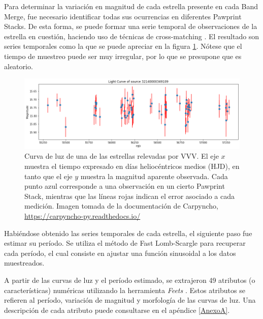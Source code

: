 \par Para determinar la variación en magnitud de cada estrella presente en cada Band Merge, fue necesario identificar todas sus ocurrencias en diferentes Pawprint Stacks. De esta forma, se puede formar una serie temporal de observaciones de la estrella en cuestión, haciendo uso de técnicas de cross-matching \cite{cross}. El resultado son series temporales como la que se puede apreciar en la figura \ref{fig:curva_de_luz}. Nótese que el tiempo de muestreo puede ser muy irregular, por lo que se presupone que es aleatorio. \\


\begin{figure}[h]
\begin{center}
\includegraphics[width=\textwidth]{Kap1/light_curve.png}
\end{center}
\caption[short]{Curva de luz de una de las estrellas relevadas por VVV. El eje $x$ muestra el tiempo expresado en días heliocéntricos medios (HJD), en tanto que el eje $y$ muestra la magnitud aparente observada. Cada punto azul corresponde a una observación en un cierto Pawprint Stack, mientras que las líneas rojas indican el error asociado a cada medición. Imagen tomada de la documentación de Carpyncho, \url{https://carpyncho-py.readthedocs.io/} }
\label{fig:curva_de_luz}
\end{figure}

\par Habiéndose obtenido las series temporales de cada estrella, el siguiente paso fue estimar su período. Se utiliza el método de Fast Lomb-Scargle \cite{Lomb:1976wy} \cite{scargle} \cite{VanderPlas_2018} para recuperar cada período, el cual consiste en ajustar una función sinusoidal a los datos muestreados. \\

\par A partir de las curvas de luz y el período estimado, se extrajeron 49 atributos (o características) numéricas utilizando la herramienta \textit{Feets} \cite{cabral2018fats}. Estos atributos se refieren al período, variación de magnitud y morfología de las curvas de luz. Una descripción de cada atributo puede consultarse en el apéndice \ref{AnexoA}. \\


